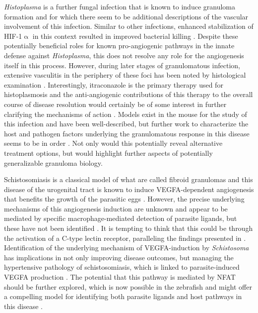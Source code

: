 \textit{Histoplasma} is a further fungal infection that is known to induce granuloma formation and for which there seem to be additional descriptions of the vascular involvement of this infection. Similar to other infections, enhanced stabilization of HIF\hyp{}1$\upalpha$ in this context resulted in improved bacterial killing \citep{Friedrich2017, Friedrich2019}. Despite these potentially beneficial roles for known pro\hyp{}angiogenic pathways in the innate defense against \textit{Histoplasma}, this does not resolve any role for the angiogenesis itself in this process. However, during later stages of granulomatous infection, extensive vasculitis in the periphery of these foci has been noted by histological examination \citep{Mukhopadhyay2010, Kauffman2007, Mann2000}. Interestingly, itraconazole is the primary therapy used for histoplasmosis and the anti\hyp{}angiogenic contributions of this therapy to the overall course of disease resolution would certainly be of some interest in further clarifying the mechanisms of action \citep{Kauffman2007}. Models exist in the mouse for the study of this infection and have been well\hyp{}described, but further work to characterize the host and pathogen factors underlying the granulomatous response in this disease seems to be in order \citep{Heninger2006}. Not only would this potentially reveal alternative treatment options, but would highlight further aspects of potentially generalizable granuloma biology.

Schistosomiasis is a classical model of what are called fibroid granulomas and this disease of the urogenital tract is known to induce VEGFA\hyp{}dependent angiogenesis that benefits the growth of the parasitic eggs \citep{Shariati2011, Pereira2013, Figueiredo2015, Chabon2014, Loeffler2002}. However, the precise underlying mechanisms of this angiogenesis induction are unknown and appear to be mediated by specific macrophage\hyp{}mediated detection of parasite ligands, but these have not been identified \citep{Loeffler2002}. It is tempting to think that this could be through the activation of a C-type lectin receptor, paralleling the findings presented in \citet{Brewer2022}. Identification of the underlying mechanism of VEGFA\hyp{}induction by \textit{Schistosoma} has implications in not only improving disease outcomes, but managing the hypertensive pathology of schistosomiasis, which is linked to parasite\hyp{}induced VEGFA production \citep{Chabon2014}. The potential that this pathway is mediated by NFAT should be further explored, which is now possible in the zebrafish and might offer a compelling model for identifying both parasite ligands and host pathways in this disease \citep{Takaki2021}. 

